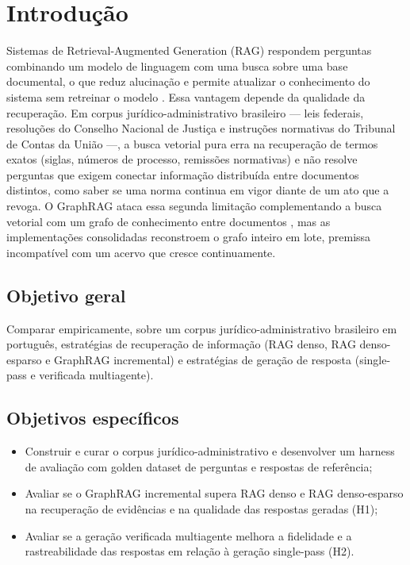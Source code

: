 
\section{Introdução}

Sistemas de Retrieval-Augmented Generation (RAG) respondem perguntas
combinando um modelo de linguagem com uma busca sobre uma base documental, o
que reduz alucinação e permite atualizar o conhecimento do sistema sem
retreinar o modelo \parencite{lewis2020}. Essa vantagem depende da qualidade
da recuperação. Em corpus jurídico-administrativo brasileiro --- leis
federais, resoluções do Conselho Nacional de Justiça e instruções normativas
do Tribunal de Contas da União ---, a busca vetorial pura
erra na recuperação de termos exatos (siglas, números de processo, remissões
normativas) e não resolve perguntas que exigem conectar informação
distribuída entre documentos distintos, como saber se uma norma continua em
vigor diante de um ato que a revoga. O GraphRAG ataca essa segunda limitação
complementando a busca vetorial com um grafo de conhecimento entre documentos
\parencite{edge2024}, mas as implementações consolidadas reconstroem o grafo
inteiro em lote, premissa incompatível com um acervo que cresce
continuamente.

\subsection{Objetivo geral}

Comparar empiricamente, sobre um corpus jurídico-administrativo brasileiro em
português, estratégias de recuperação de informação (RAG denso, RAG
denso-esparso e GraphRAG incremental) e estratégias de geração de resposta
(single-pass e verificada multiagente).

\subsection{Objetivos específicos}

\begin{itemize}
  \item Construir e curar o corpus jurídico-administrativo e desenvolver um harness de avaliação com golden dataset de perguntas e respostas de referência;
  \item Avaliar se o GraphRAG incremental supera RAG denso e RAG denso-esparso na recuperação de evidências e na qualidade das respostas geradas (H1);
  \item Avaliar se a geração verificada multiagente melhora a fidelidade e a rastreabilidade das respostas em relação à geração single-pass (H2).
\end{itemize}

